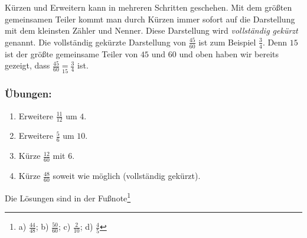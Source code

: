 Kürzen und Erweitern kann in mehreren Schritten geschehen. Mit dem größten gemeinsamen Teiler kommt man durch Kürzen immer sofort auf die Darstellung mit dem kleinsten Zähler und Nenner. Diese Darstellung wird \emph{vollständig gekürzt} genannt. Die vollständig gekürzte Darstellung von $\frac{45}{60}$ ist zum Beispiel $\frac{3}{4}$. Denn $15$ ist der größte gemeinsame Teiler von $45$ und $60$ und oben haben wir bereits gezeigt, dass $\frac{45}{60}\underset{15}{=}\frac{3}{4}$ ist.


\subsubsection*{Übungen:}\vspace{-1em}
\begin{enumerate}[label=\alph*)]
	\item Erweitere $\frac{11}{12}$ um $4$.
	\item Erweitere $\frac{5}{6}$ um $10$.
	\item Kürze $\frac{12}{60}$ mit $6$.
	\item Kürze $\frac{48}{60}$ soweit wie möglich (vollständig gekürzt).
\end{enumerate}
Die Lösungen sind in der Fußnote\footnote{a) $\frac{44}{48}$; b) $\frac{50}{60}$; c) $\frac{2}{10}$; d) $\frac{4}{5}$}
